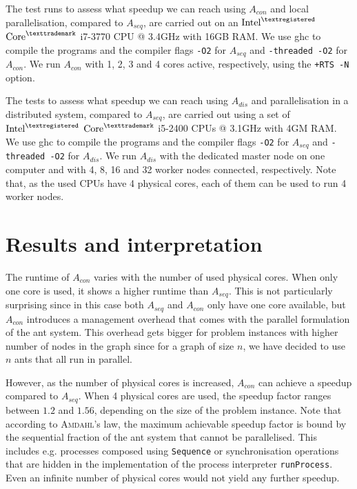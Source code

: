 The test runs to assess what speedup we can reach using $A_{con}$ and local parallelisation, compared to $A_{seq}$, are carried out on an $\text{Intel}^{\textregistered}$ $\text{Core}^{\texttrademark}$ i7-3770 CPU @ 3.4GHz with 16GB RAM. We use \textsf{ghc} to compile the programs and the compiler flags \texttt{-O2} for $A_{seq}$ and \texttt{-threaded -O2} for $A_{con}$. We run $A_{con}$ with 1, 2, 3 and 4 cores active, respectively, using the \texttt{+RTS -N} option.

The tests to assess what speedup we can reach using $A_{dis}$ and parallelisation in a distributed system, compared to $A_{seq}$, are carried out using a set of $\text{Intel}^{\textregistered}$ $\text{Core}^{\texttrademark}$ i5-2400 CPUs @ 3.1GHz with 4GM RAM. We use \textsf{ghc} to compile the programs and the compiler flags \texttt{-O2} for $A_{seq}$ and \texttt{-threaded -O2} for $A_{dis}$. We run $A_{dis}$ with the dedicated master node on one computer and with 4, 8, 16 and 32 worker nodes connected, respectively. Note that, as the used CPUs have 4 physical cores, each of them can be used to run 4 worker nodes.

\section{Results and interpretation}
The runtime of $A_{con}$ varies with the number of used physical cores. When only one core is used, it shows a higher runtime than $A_{seq}$. This is not particularly surprising since in this case both $A_{seq}$ and $A_{con}$ only have one core available, but $A_{con}$ introduces a management overhead that comes with the parallel formulation of the ant system. This overhead gets bigger for problem instances with higher number of nodes in the graph since for a graph of size $n$, we have decided to use $n$ ants that all run in parallel.

However, as the number of physical cores is increased, $A_{con}$ can achieve a speedup compared to $A_{seq}$. When 4 physical cores are used, the speedup factor ranges between $1.2$ and $1.56$, depending on the size of the problem instance. Note that according to \textsc{Amdahl}'s law, the maximum achievable speedup factor is bound by the sequential fraction of the ant system that cannot be parallelised. This includes e.g. processes composed using \texttt{Sequence} or synchronisation operations that are hidden in the implementation of the process interpreter \texttt{runProcess}. Even an infinite number of physical cores would not yield any further speedup.

